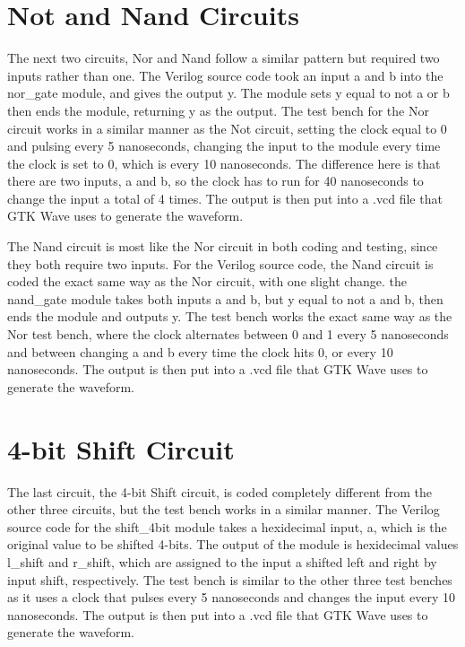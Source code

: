\documentclass[runningheads, 12pt]{report}
\begin{document}
		\section{Not and Nand Circuits}
	
	The next two circuits, Nor and Nand follow a similar pattern but required two inputs rather than one. The Verilog source code took an input a and b into the nor\_gate module, and gives the output y. The module sets y equal to not a or b  then ends the module, returning y as the output. The test bench for the Nor circuit works in a similar manner as the Not circuit, setting the clock equal to 0 and pulsing every 5 nanoseconds, changing the input to the module every time the clock is set to 0, which is every 10 nanoseconds. The difference here is that there are two inputs, a and b, so the clock has to run for 40 nanoseconds to change the input a total of 4 times. The output is then put into a .vcd file that GTK Wave uses to generate the waveform. 

	The Nand circuit is most like the Nor circuit in both coding and testing, since they both require two inputs. For the Verilog source code, the Nand circuit is coded the exact same way as the Nor circuit, with one slight change. the nand\_gate module takes both inputs a and b, but y equal to not a and b, then ends the module and outputs y. The test bench works the exact same way as the Nor test bench, where the clock alternates between 0 and 1 every 5 nanoseconds and between changing a and b every time the clock hits 0, or every 10 nanoseconds. The output is then put into a .vcd file that GTK Wave uses to generate the waveform.
	
	\section{4-bit Shift Circuit}

The last circuit, the 4-bit Shift circuit, is coded completely different from the other three circuits, but the test bench works in a similar manner. The Verilog source code for the shift\_4bit module takes a hexidecimal input, a, which is the original  value to be shifted 4-bits. The output of the module is hexidecimal values l\_shift and r\_shift, which are assigned to the input a shifted left and right by input shift, respectively. The test bench is similar to the other three test benches as it uses a clock that pulses every 5 nanoseconds and changes the input every 10 nanoseconds. The output is then put into a .vcd file that GTK Wave uses to generate the waveform. 
\end{document}

